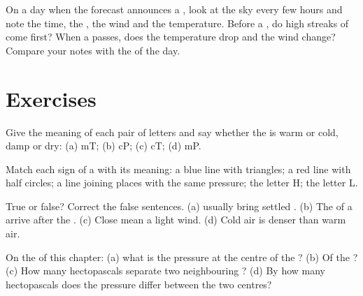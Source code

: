 \begin{inthefield}
On a day when the forecast announces a , look at the sky every few
hours and note the time, the , the wind and the temperature. Before
a , do high streaks of  come first? When a 
passes, does the temperature drop and the wind change? Compare your notes
with the   of the day.
\end{inthefield}

\section{Exercises}

\begin{exercise}[$\star$]\label{exo:g8:fronts-and-weather-maps:1}
Give the meaning of each pair of letters and say whether the  is
warm or cold, damp or dry: (a) mT; (b) cP; (c) cT; (d) mP.
\end{exercise}

\begin{exercise}[$\star$]\label{exo:g8:fronts-and-weather-maps:2}
Match each sign of a   with its meaning: a blue line with
triangles; a red line with half circles; a line joining places with the
same pressure; the letter H; the letter L.
\end{exercise}

\begin{exercise}[$\star$]\label{exo:g8:fronts-and-weather-maps:3}
True or false? Correct the false sentences. (a)  usually bring
settled . (b) The  of a  arrive after the .
(c) Close  mean a light wind. (d) Cold air is denser than warm
air.
\end{exercise}

\begin{exercise}[$\star$]\label{exo:g8:fronts-and-weather-maps:4}
On the   of this chapter: (a) what is the pressure at the
centre of the ? (b) Of the ? (c) How many
hectopascals separate two neighbouring ? (d) By how many
hectopascals does the pressure differ between the two centres?
\end{exercise}

